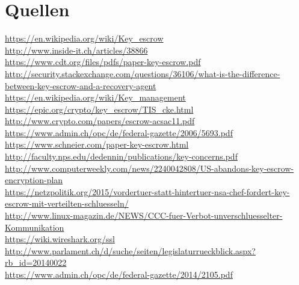 \documentclass[a4paper, 10pt, fleqn]{article}
\begin{document}
\section*{Quellen}
\url{https://en.wikipedia.org/wiki/Key_escrow}\\
\url{http://www.inside-it.ch/articles/38866}\\
\url{https://www.cdt.org/files/pdfs/paper-key-escrow.pdf}\\
\url{http://security.stackexchange.com/questions/36106/what-is-the-difference-between-key-escrow-and-a-recovery-agent}\\
\url{https://en.wikipedia.org/wiki/Key_management}\\
\url{https://epic.org/crypto/key_escrow/TIS_cke.html}\\
\url{http://www.crypto.com/papers/escrow-acsac11.pdf}\\
\url{https://www.admin.ch/opc/de/federal-gazette/2006/5693.pdf} \\ %
\url{https://www.schneier.com/paper-key-escrow.html} \\ %
\url{http://faculty.nps.edu/dedennin/publications/key-concerns.pdf} \\ %
\url{http://www.computerweekly.com/news/2240042808/US-abandons-key-escrow-encryption-plan} \\ %
\url{https://netzpolitik.org/2015/vordertuer-statt-hintertuer-nsa-chef-fordert-key-escrow-mit-verteilten-schluesseln/} \\ %
\url{http://www.linux-magazin.de/NEWS/CCC-fuer-Verbot-unverschluesselter-Kommunikation} \\ %
\url{https://wiki.wireshark.org/ssl}\\
\url{http://www.parlament.ch/d/suche/seiten/legislaturrueckblick.aspx?rb_id=20140022} \\ %
\url{https://www.admin.ch/opc/de/federal-gazette/2014/2105.pdf} \\ %
\end{document}
